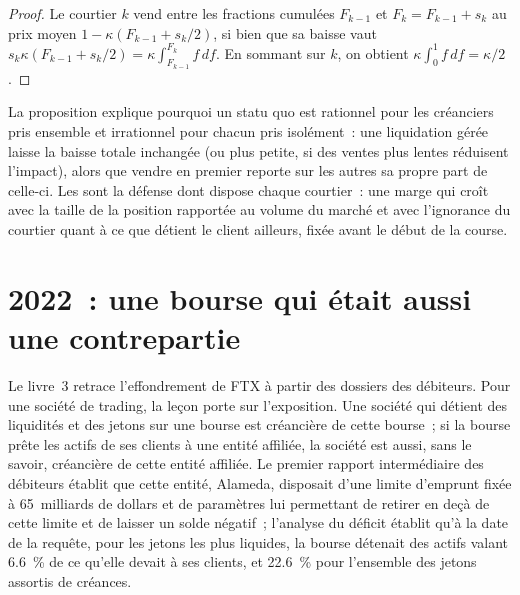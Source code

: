 \begin{proof}
Le courtier $k$ vend entre les fractions cumulées $F_{k-1}$ et $F_k=F_{k-1}+s_k$ au prix moyen $1-\kappa(F_{k-1}+s_k/2)$, si bien que sa baisse vaut
$s_k\kappa(F_{k-1}+s_k/2)=\kappa\int_{F_{k-1}}^{F_k}f\,df$. En sommant sur $k$, on obtient $\kappa\int_0^1f\,df=\kappa/2$.
\end{proof}

La proposition explique pourquoi un statu quo est rationnel pour les créanciers pris ensemble et irrationnel pour chacun pris isolément~: une liquidation gérée laisse la baisse totale
inchangée (ou plus petite, si des ventes plus lentes réduisent l'impact), alors que vendre en premier reporte sur les autres sa propre part de celle-ci. Les 
sont la défense dont dispose chaque courtier~: une marge qui croît avec la taille de la position rapportée au volume du marché et avec l'ignorance du courtier
quant à ce que détient le client ailleurs, fixée avant le début de la course.

\section{2022~: une bourse qui était aussi une contrepartie}

Le livre~3 retrace l'effondrement de FTX à partir des dossiers des débiteurs. Pour une société de trading, la leçon porte sur l'exposition. Une société qui détient des liquidités et des jetons sur une bourse
est créancière de cette bourse~; si la bourse prête les actifs de ses clients à une entité affiliée, la société est aussi, sans le savoir, créancière de cette
entité affiliée. Le premier rapport intermédiaire des débiteurs établit que cette entité, Alameda, disposait d'une limite d'emprunt fixée à 65~milliards de dollars et de paramètres lui permettant de retirer en deçà de cette limite et de laisser un solde négatif~; l'analyse du déficit
établit qu'à la date de la requête, pour les jetons les plus liquides, la bourse détenait des actifs
valant 6.6~\% de ce qu'elle devait à ses clients, et 22.6~\% pour l'ensemble des jetons assortis de créances.

